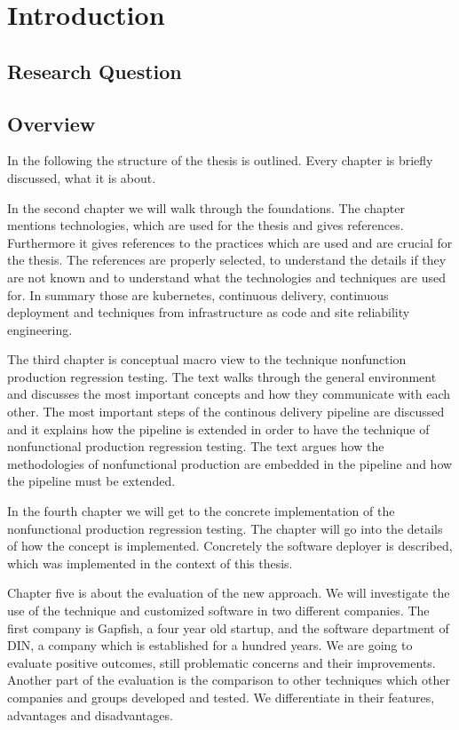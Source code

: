 \chapter{Introduction}
\section{Research Question}
\section{Overview}

In the following the structure of the thesis is outlined. Every chapter is briefly discussed, what it is about.

In the second chapter we will walk through the foundations. The chapter mentions technologies, which are used for the thesis and gives references. Furthermore it gives references to the practices which are used and are crucial for the thesis. The references are properly selected, to understand the details if they are not known and to understand what the technologies and techniques are used for. In summary those are kubernetes, continuous delivery, continuous deployment and techniques from infrastructure as code and site reliability engineering.

The third chapter is conceptual macro view to the technique nonfunction production regression testing. The text walks through the general environment and discusses the most important concepts and how they communicate with each other. The most important steps of the continous delivery pipeline are discussed and it explains how the pipeline is extended in order to have the technique of nonfunctional production regression testing. The text argues how the methodologies of nonfunctional production are embedded in the pipeline and how the pipeline must be extended.

In the fourth chapter we will get to the concrete implementation of the nonfunctional production regression testing. The chapter will go into the details of how the concept is implemented. Concretely the software deployer is described, which was implemented in the context of this thesis.

Chapter five is about the evaluation of the new approach. We will investigate the use of the technique and customized software in two different companies. The first company is Gapfish, a four year old startup, and the software department of DIN, a company which is established for a hundred years. We are going to evaluate positive outcomes, still problematic concerns and their improvements. Another part of the evaluation is the comparison to other techniques which other companies and groups developed and tested. We differentiate in their features, advantages and disadvantages.

